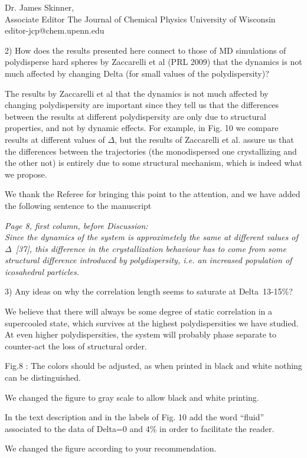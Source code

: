 \documentclass[a4paper, rebuttal, parskip=true, firsthead=false, fromemail=false, foldmarks=false]{scrlttr2}
\begin{document}
\begin{letter}{Dr. James Skinner,\\Associate Editor
The Journal of Chemical Physics
University of Wisconsin\\
editor-jcp@chem.upenn.edu }
\begin{quotationi}
2) How does the results presented here connect to those of MD simulations of polydisperse hard spheres by Zaccarelli et al (PRL 2009) that the dynamics is not much affected by changing Delta (for small values of the polydispersity)?
\end{quotationi}

The results by Zaccarelli et al that the dynamics is not much affected by changing polydispersity are important since they tell
us that the differences between the results at different polydispersity are only due to structural properties, and not by
dynamic effects. For example, in Fig. 10 we compare results at different values of $\Delta$, but the results of Zaccarelli et al.
assure us that the differences between the trajectories (the monodispersed one crystallizing and the other not) is entirely due
to some structural mechanism, which is indeed what we propose.

We thank the Referee for bringing this point to the attention, and we have added the following sentence to the manuscript

{\it Page 8, first column, before Discussion:\\
Since the dynamics of the
system is approximetely the same at different values of $\Delta$~[37], this difference in the crystallization behaviour has to come from
some structural difference introduced by polydispersity, i.e. an increased population of icosahedral particles.}


\begin{quotationi}
3) Any ideas on why the correlation length seems to saturate at Delta~13-15\%?
\end{quotationi}

We believe that there will always be some degree of static correlation in a supercooled state, which
survives at the highest polydispersities we have studied. At even higher polydispersities, the system
will probably phase separate to counter-act the loss of structural order.


\begin{quotationi}
Fig.8 : The colors should be adjusted, as when printed in black and white nothing can be distinguished.
\end{quotationi}
We changed the figure to gray scale to allow black and white printing.

\begin{quotationi}
In the text description and in the labels of Fig. 10 add the word ``fluid'' associated to the data of Delta=0 and 4\% in order to facilitate the reader.
\end{quotationi}
We changed the figure according to your recommendation.


\end{letter}
\end{document}
